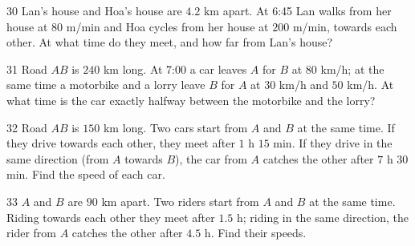 \gap
\begin{probbox}{30}{\relax}
Lan's house and Hoa's house are $4.2$ km apart. At 6:45 Lan walks from her house at $80$ m/min and Hoa cycles from her house at $200$ m/min, towards each other. At what time do they meet, and how far from Lan's house?
\end{probbox}
\begin{probbox}{31}{}
Road $AB$ is $240$ km long. At 7:00 a car leaves $A$ for $B$ at $80$ km/h; at the same time a motorbike and a lorry leave $B$ for $A$ at $30$ km/h and $50$ km/h. At what time is the car exactly halfway between the motorbike and the lorry?
\end{probbox}
\gap
\begin{probbox}{32}{}
Road $AB$ is $150$ km long. Two cars start from $A$ and $B$ at the same time. If they drive towards each other, they meet after $1$ h $15$ min. If they drive in the same direction (from $A$ towards $B$), the car from $A$ catches the other after $7$ h $30$ min. Find the speed of each car.
\end{probbox}
\gap
\begin{probbox}{33}{}
$A$ and $B$ are $90$ km apart. Two riders start from $A$ and $B$ at the same time. Riding towards each other they meet after $1.5$ h; riding in the same direction, the rider from $A$ catches the other after $4.5$ h. Find their speeds.
\end{probbox}
